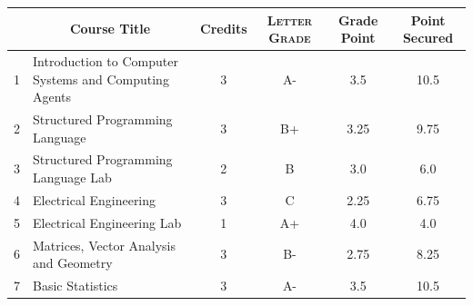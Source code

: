 \documentclass[11pt]{article}
\newcommand*{\numtwo}[1]{\pgfmathprintnumber[
                    fixed, precision=2, fixed zerofill=true]{#1}}
\begin{document}
                \begin{center}
                    \renewcommand{\arraystretch}{1.08}
                    
                \begin{tabular}{|c|l|c|>{\scshape}c|c|c|}
                \hline  \rule[-1ex]{0pt}{3.5ex} {\centering{\bf Course Code}} &  \multicolumn{1}{c|}{\textbf{Course Title}}  & {\bf Credits} & {\bf Letter Grade} & {\bf Grade Point} & {\bf Point Secured}  \\ 
                \hline   1 &  Introduction to Computer Systems and Computing Agents		 & 3 & A- & 3.5 & 10.5 \\ %
                \hline   2 &  Structured Programming Language		 & 3 & B+ & 3.25 & 9.75 \\ %
                \hline   3 &  Structured Programming Language Lab		 & 2 & B & 3.0 & 6.0 \\ %
                \hline   4 &  Electrical Engineering		 & 3 & C & 2.25 & 6.75 \\ %
                \hline   5 &  Electrical Engineering Lab		 & 1 & A+ & 4.0 & 4.0 \\ %
                \hline   6 &  Matrices, Vector Analysis and Geometry		 & 3 & B- & 2.75 & 8.25 \\ %
                \hline   7 &  Basic Statistics		 & 3 & A- & 3.5 & 10.5 \\ %

\hline                %
                \end{tabular}
                \end{center}
                \renewcommand{\arraystretch}{1.03}
\end{document}
